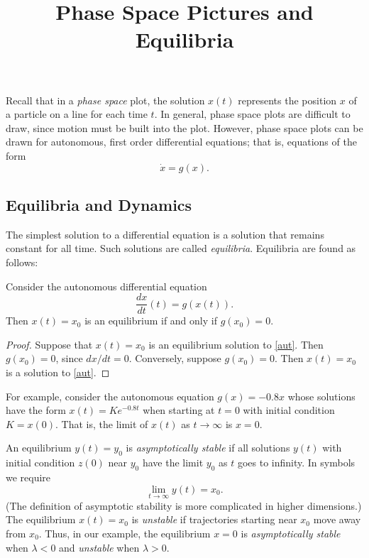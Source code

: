 \documentclass{ximera}
\title{Phase Space Pictures and Equilibria}
\begin{document}
\begin{abstract}
\end{abstract}
\maketitle

 \label{S:PSP&E}


Recall that in a {\em phase space\/}  plot, the 
solution $x(t)$ represents the position $x$ of a particle on a line 
for each time $t$.  In general, phase space plots are difficult to draw, since 
motion must be built into the plot.  However, phase space plots can be drawn for
 autonomous, first order differential equations; that is, equations of the
form
\[
\dot{x} = g(x).
\]

\subsection*{Equilibria and Dynamics}

The simplest solution to a differential equation is a solution
that remains constant for all time.  Such solutions are called
{\em equilibria\/}.  Equilibria are found as follows:
\begin{lemma}  \label{L:equilibria}
Consider the autonomous  differential equation
\begin{equation} \label{aut}
\frac{dx}{dt}(t) = g(x(t)).
\end{equation}
Then $x(t)=x_0$ is an equilibrium  if and only
if $g(x_0)=0$.
\end{lemma}

\begin{proof} Suppose that $x(t)=x_0$ is an equilibrium solution to
\eqref{aut}. Then $g(x_0)=0$, since $dx/dt = 0$.  Conversely,
suppose $g(x_0)=0$.  Then $x(t)=x_0$ is a solution to \eqref{aut}.
\end{proof}

For  example, consider the autonomous equation $g(x)=-0.8x$ 
whose solutions have the form $x(t) = Ke^{-0.8t}$ when starting 
at $t=0$ with initial condition $K=x(0)$.  That is, the limit of 
$x(t)$ as $t\to\infty$ is $x=0$.

An equilibrium $y(t)=y_0$ is {\em asymptotically stable\/}
 if all solutions $y(t)$ with
initial condition $z(0)$ near $y_0$ have the limit
$y_0$ as $t$ goes to infinity.  In symbols we require
\[
\lim_{t\to\infty} y(t) = x_0.
\]
(The definition of asymptotic stability is more complicated in
higher dimensions.) The equilibrium $x(t)=x_0$ is {\em unstable\/}
 if trajectories starting near $x_0$ move away
from $x_0$.  Thus, in
our example, the equilibrium $x=0$ is {\em asymptotically
stable\/} when $\lambda< 0$ and {\em unstable\/}
when $\lambda> 0$.
\end{document}
